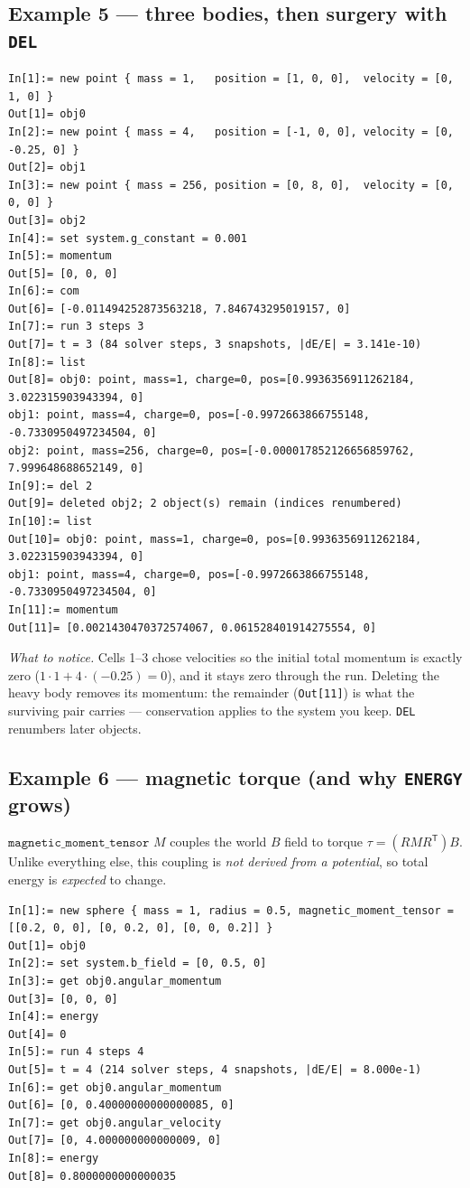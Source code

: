 \documentclass[11pt]{article}
\newcommand{\kw}[1]{\texttt{\uppercase{#1}}}
\newcommand{\code}[1]{\texttt{#1}}
\begin{document}
\subsection{Example 5 --- three bodies, then surgery with \kw{del}}

\begin{lstlisting}
In[1]:= new point { mass = 1,   position = [1, 0, 0],  velocity = [0, 1, 0] }
Out[1]= obj0
In[2]:= new point { mass = 4,   position = [-1, 0, 0], velocity = [0, -0.25, 0] }
Out[2]= obj1
In[3]:= new point { mass = 256, position = [0, 8, 0],  velocity = [0, 0, 0] }
Out[3]= obj2
In[4]:= set system.g_constant = 0.001
In[5]:= momentum
Out[5]= [0, 0, 0]
In[6]:= com
Out[6]= [-0.011494252873563218, 7.846743295019157, 0]
In[7]:= run 3 steps 3
Out[7]= t = 3 (84 solver steps, 3 snapshots, |dE/E| = 3.141e-10)
In[8]:= list
Out[8]= obj0: point, mass=1, charge=0, pos=[0.9936356911262184, 3.022315903943394, 0]
obj1: point, mass=4, charge=0, pos=[-0.9972663866755148, -0.7330950497234504, 0]
obj2: point, mass=256, charge=0, pos=[-0.000017852126656859762, 7.999648688652149, 0]
In[9]:= del 2
Out[9]= deleted obj2; 2 object(s) remain (indices renumbered)
In[10]:= list
Out[10]= obj0: point, mass=1, charge=0, pos=[0.9936356911262184, 3.022315903943394, 0]
obj1: point, mass=4, charge=0, pos=[-0.9972663866755148, -0.7330950497234504, 0]
In[11]:= momentum
Out[11]= [0.0021430470372574067, 0.061528401914275554, 0]
\end{lstlisting}

\emph{What to notice.} Cells 1--3 chose velocities so the initial total
momentum is exactly zero ($1\cdot1 + 4\cdot(-0.25) = 0$), and it stays
zero through the run. Deleting the heavy body removes its momentum: the
remainder (\code{Out[11]}) is what the surviving pair carries ---
conservation applies to the system you keep. \kw{del} renumbers later
objects.

\subsection{Example 6 --- magnetic torque (and why \kw{energy} grows)}

$\code{magnetic\_moment\_tensor}$ $M$ couples the world $B$ field to
torque $\tau = (RMR^{\mathsf T})B$. Unlike everything else, this
coupling is \emph{not derived from a potential}, so total energy is
\emph{expected} to change.

\begin{lstlisting}
In[1]:= new sphere { mass = 1, radius = 0.5, magnetic_moment_tensor = [[0.2, 0, 0], [0, 0.2, 0], [0, 0, 0.2]] }
Out[1]= obj0
In[2]:= set system.b_field = [0, 0.5, 0]
In[3]:= get obj0.angular_momentum
Out[3]= [0, 0, 0]
In[4]:= energy
Out[4]= 0
In[5]:= run 4 steps 4
Out[5]= t = 4 (214 solver steps, 4 snapshots, |dE/E| = 8.000e-1)
In[6]:= get obj0.angular_momentum
Out[6]= [0, 0.40000000000000085, 0]
In[7]:= get obj0.angular_velocity
Out[7]= [0, 4.000000000000009, 0]
In[8]:= energy
Out[8]= 0.8000000000000035
\end{lstlisting}
\end{document}
